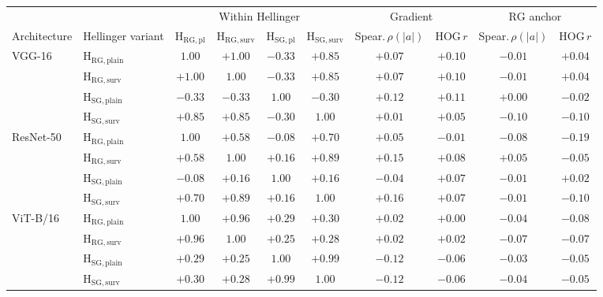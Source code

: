 \begin{tabular}{ll cccc cccc}
  \toprule
  & & \multicolumn{4}{c}{Within Hellinger} & \multicolumn{2}{c}{Gradient} & \multicolumn{2}{c}{$\mathrm{RG}$ anchor} \\
  \cmidrule(lr){3-6} \cmidrule(lr){7-8} \cmidrule(lr){9-10}
  Architecture & Hellinger variant
    & $\mathrm{H}_{\mathrm{RG,pl}}$ & $\mathrm{H}_{\mathrm{RG,surv}}$
    & $\mathrm{H}_{\mathrm{SG,pl}}$ & $\mathrm{H}_{\mathrm{SG,surv}}$
    & Spear.\,$\rho(|a|)$ & HOG\,$r$ & Spear.\,$\rho(|a|)$ & HOG\,$r$ \\
  \midrule
\multirow{4}{*}{VGG-16} & $\mathrm{H}_{\mathrm{RG,plain}}$ & $1.00$ & $+1.00$ & $-0.33$ & $+0.85$ & $+0.07$ & $+0.10$ & $-0.01$ & $+0.04$ \\
 & $\mathrm{H}_{\mathrm{RG,surv}}$ & $+1.00$ & $1.00$ & $-0.33$ & $+0.85$ & $+0.07$ & $+0.10$ & $-0.01$ & $+0.04$ \\
 & $\mathrm{H}_{\mathrm{SG,plain}}$ & $-0.33$ & $-0.33$ & $1.00$ & $-0.30$ & $+0.12$ & $+0.11$ & $+0.00$ & $-0.02$ \\
 & $\mathrm{H}_{\mathrm{SG,surv}}$ & $+0.85$ & $+0.85$ & $-0.30$ & $1.00$ & $+0.01$ & $+0.05$ & $-0.10$ & $-0.10$ \\
    \midrule
\multirow{4}{*}{ResNet-50} & $\mathrm{H}_{\mathrm{RG,plain}}$ & $1.00$ & $+0.58$ & $-0.08$ & $+0.70$ & $+0.05$ & $-0.01$ & $-0.08$ & $-0.19$ \\
 & $\mathrm{H}_{\mathrm{RG,surv}}$ & $+0.58$ & $1.00$ & $+0.16$ & $+0.89$ & $+0.15$ & $+0.08$ & $+0.05$ & $-0.05$ \\
 & $\mathrm{H}_{\mathrm{SG,plain}}$ & $-0.08$ & $+0.16$ & $1.00$ & $+0.16$ & $-0.04$ & $+0.07$ & $-0.01$ & $+0.02$ \\
 & $\mathrm{H}_{\mathrm{SG,surv}}$ & $+0.70$ & $+0.89$ & $+0.16$ & $1.00$ & $+0.16$ & $+0.07$ & $-0.01$ & $-0.10$ \\
    \midrule
\multirow{4}{*}{ViT-B/16} & $\mathrm{H}_{\mathrm{RG,plain}}$ & $1.00$ & $+0.96$ & $+0.29$ & $+0.30$ & $+0.02$ & $+0.00$ & $-0.04$ & $-0.08$ \\
 & $\mathrm{H}_{\mathrm{RG,surv}}$ & $+0.96$ & $1.00$ & $+0.25$ & $+0.28$ & $+0.02$ & $+0.02$ & $-0.07$ & $-0.07$ \\
 & $\mathrm{H}_{\mathrm{SG,plain}}$ & $+0.29$ & $+0.25$ & $1.00$ & $+0.99$ & $-0.12$ & $-0.06$ & $-0.03$ & $-0.05$ \\
 & $\mathrm{H}_{\mathrm{SG,surv}}$ & $+0.30$ & $+0.28$ & $+0.99$ & $1.00$ & $-0.12$ & $-0.06$ & $-0.04$ & $-0.05$ \\
  \bottomrule
\end{tabular}
